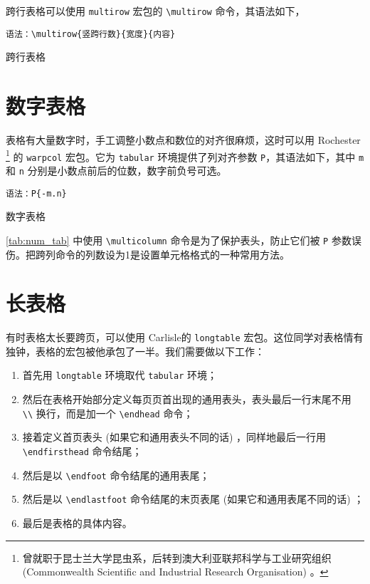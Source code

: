 跨行表格可以使用 \texttt{multirow} 宏包的 \verb|\multirow| 命令，其语法如下，

\verb|语法：\multirow{竖跨行数}{宽度}{内容}|

\begin{example}[htbp]
\caption{跨行表格}
\label{tab:multirow_tab}
\end{example}

\section{数字表格}

表格有大量数字时，手工调整小数点和数位的对齐很麻烦，这时可以用 Rochester\indexRochester{} \footnote{曾就职于昆士兰大学昆虫系，后转到澳大利亚联邦科学与工业研究组织 (Commonwealth Scientific and Industrial Research Organisation) 。} 的 \texttt{warpcol} 宏包\citep{Rochester_warpcol}。它为 \texttt{tabular} 环境提供了列对齐参数 \texttt{P}，其语法如下，其中 \texttt{m} 和 \texttt{n} 分别是小数点前后的位数，数字前负号可选。

\verb|语法：P{-m.n}|

\begin{example}[htbp]
\caption{数字表格}
\label{tab:num_tab}
\end{example}

\autoref{tab:num_tab} 中使用 \verb|\multicolumn| 命令是为了保护表头，防止它们被 \texttt{P} 参数误伤。把跨列命令的列数设为1是设置单元格格式的一种常用方法。

\section{长表格}

有时表格太长要跨页，可以使用 Carlisle\indexCarlisle 的 \texttt{longtable} 宏包\citep{Carlisle_longtable}。这位同学对表格情有独钟，表格的宏包被他承包了一半。我们需要做以下工作：

\begin{enumerate}
  \item 首先用 \texttt{longtable} 环境取代 \texttt{tabular} 环境；
  \item 然后在表格开始部分定义每页页首出现的通用表头，表头最后一行末尾不用 \verb|\\| 换行，而是加一个 \verb|\endhead| 命令；
  \item 接着定义首页表头 (如果它和通用表头不同的话) ，同样地最后一行用 \verb|\endfirsthead| 命令结尾；
  \item 然后是以 \verb|\endfoot| 命令结尾的通用表尾；
  \item 然后是以 \verb|\endlastfoot| 命令结尾的末页表尾 (如果它和通用表尾不同的话) ；
  \item 最后是表格的具体内容。
\end{enumerate}

